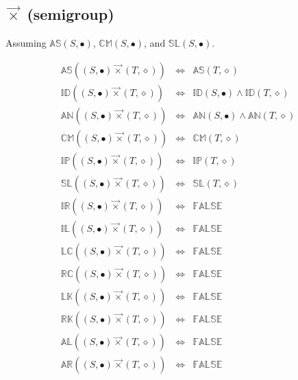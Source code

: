 \documentclass[10pt]{article}
\newcommand{\propname}[1]{{\mathbb{#1}}}
\begin{document}
\subsection{$\vec{\times}$ (semigroup)} 

Assuming 
$\propname{AS}(S, \bullet)$, 
$\propname{CM}(S, \bullet)$,  and 
$\propname{SL}(S, \bullet)$. 

\[
\begin{array}{rcl} 
\propname{AS}((S, \bullet) \vec{\times} (T, \diamond)) 
   & \Leftrightarrow %
   & \propname{AS}(T, \diamond) \\ 
\propname{ID}((S, \bullet) \vec{\times} (T, \diamond)) 
   & \Leftrightarrow %
   & \propname{ID}(S, \bullet) \wedge  \propname{ID}(T, \diamond) \\ 
\propname{AN}((S, \bullet) \vec{\times} (T, \diamond)) 
   & \Leftrightarrow %
   & \propname{AN}(S, \bullet) \wedge  \propname{AN}(T, \diamond) \\ 
\propname{CM}((S, \bullet) \vec{\times} (T, \diamond)) 
   & \Leftrightarrow %
   & \propname{CM}(T, \diamond) \\ 
\propname{IP}((S, \bullet) \vec{\times} (T, \diamond)) 
   & \Leftrightarrow %
   & \propname{IP}(T, \diamond) \\ 
\propname{SL}((S, \bullet) \vec{\times}  (T, \diamond)) 
   & \Leftrightarrow %
   & \propname{SL}(T, \diamond) \\ 
\propname{IR}((S, \bullet) \vec{\times}  (T, \diamond)) 
   & \Leftrightarrow %
   & \propname{FALSE} \\
\propname{IL}((S, \bullet) \vec{\times}  (T, \diamond)) 
   & \Leftrightarrow %
   & \propname{FALSE} \\
\propname{LC}((S, \bullet) \vec{\times} (T, \diamond)) 
   & \Leftrightarrow %
   & \propname{FALSE} \\
\propname{RC}((S, \bullet) \vec{\times} (T, \diamond)) 
   & \Leftrightarrow %
   & \propname{FALSE} \\
\propname{LK}((S, \bullet) \vec{\times} (T, \diamond)) 
   & \Leftrightarrow %
   & \propname{FALSE} \\
\propname{RK}((S, \bullet) \vec{\times} (T, \diamond)) 
   & \Leftrightarrow %
   & \propname{FALSE} \\
\propname{AL}((S, \bullet) \vec{\times}  (T, \diamond))  
   & \Leftrightarrow %
   & \propname{FALSE} \\
\propname{AR}((S, \bullet) \vec{\times}  (T, \diamond))  
   & \Leftrightarrow %
   & \propname{FALSE} \\
\end{array} 
\] 
\end{document}
